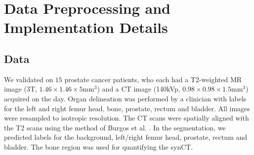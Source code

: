 


\section{Data Preprocessing and Implementation Details}
\subsection{Data}
We validated on $15$ prostate cancer patients, who each had a T2-weighted MR image (3T, $1.46\times1.46\times5$mm$^{3}$) and a CT image (140kVp, $0.98\times0.98\times1.5$mm$^{3}$) acquired on the day. Organ delineation was performed by a clinician with labels for the left and right femur head, bone, prostate, rectum and bladder. All images were resampled to isotropic resolution. The CT scans were spatially aligned with the T2 scans using the method of Burgos et al. \cite{ninon2017}. In the segmentation, we predicted labels for the background, left/right femur head, prostate, rectum and bladder. The bone region was used for quantifying the synCT.

